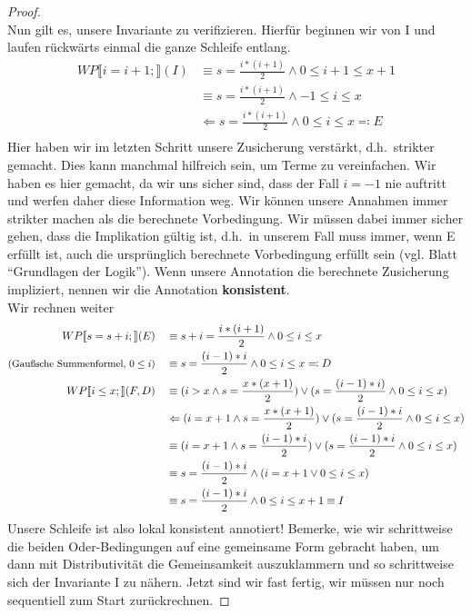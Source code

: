 \documentclass[hidelinks]{article}
\theoremstyle{plain}
\theoremstyle{definition}
\theoremstyle{rem}
\begin{document}
\begin{sloppypar}
\begin{proof}
\begin{equation*}
\end{equation*}
Nun gilt es, unsere Invariante zu verifizieren. Hierfür beginnen wir von I und laufen rückwärts einmal die ganze Schleife entlang.
\begin{align*}
WP\llbracket i=i+1;\rrbracket(I)&\equiv s=\frac{i*(i+1)}{2}\wedge 0\le i+1\le x+1\\
&\equiv s=\frac{i*(i+1)}{2}\wedge -1\le i\le x\\
&\Leftarrow s=\frac{i*(i+1)}{2}\wedge 0\le i\le x\eqqcolon E\\
\end{align*}
Hier haben wir im letzten Schritt unsere Zusicherung verstärkt, d.h.\ strikter gemacht. Dies kann manchmal hilfreich sein, um Terme zu vereinfachen. Wir haben es hier gemacht, da wir uns sicher sind, dass der Fall $i=-1$ nie auftritt und werfen daher diese Information weg. Wir können unsere Annahmen immer strikter machen als die berechnete Vorbedingung. Wir müssen dabei immer sicher gehen, dass die Implikation gültig ist, d.h.\ in unserem Fall muss immer, wenn E erfüllt ist, auch die ursprünglich berechnete Vorbedingung erfüllt sein (vgl. Blatt ``Grundlagen der Logik''). Wenn unsere Annotation die berechnete Zusicherung impliziert, nennen wir die Annotation \textbf{konsistent}.\\
Wir rechnen weiter
\begin{align*}
WP\llbracket s=s+i;\rrbracket(E)\quad&\equiv s+i=\frac{i*(i+1)}{2}\wedge 0\le i\le x\\
\text{\small{(Gaußsche Summenformel, $0\le i$)}}\quad&\equiv s=\frac{(i-1)*i}{2}\wedge 0\le i\le x\eqqcolon D\\
WP\llbracket i\le x;\rrbracket(F,D)\quad&\equiv (i>x \wedge s=\frac{x*(x+1)}{2})\vee (s=\frac{(i-1)*i)}{2}\wedge 0\le i\le x)\\
&\Leftarrow (i=x+1 \wedge s=\frac{x*(x+1)}{2})\vee (s=\frac{(i-1)*i}{2}\wedge 0\le i\le x)\\
&\equiv (i=x+1 \wedge s=\frac{(i-1)*i}{2})\vee (s=\frac{(i-1)*i}{2}\wedge 0\le i\le x)\\
&\equiv s=\frac{(i-1)*i}{2}\wedge(i=x+1 \vee 0\le i\le x)\\
&\equiv s=\frac{(i-1)*i}{2}\wedge 0\le i\le x+1\equiv I
\end{align*}
Unsere Schleife ist also lokal konsistent annotiert! Bemerke, wie wir schrittweise die beiden Oder-Bedingungen auf eine gemeinsame Form gebracht haben, um dann mit Distributivität die Gemeinsamkeit auszuklammern und so schrittweise sich der Invariante I zu nähern. Jetzt sind wir fast fertig, wir müssen nur noch sequentiell zum Start zurückrechnen.

\end{proof}
\end{sloppypar}
\end{document}
